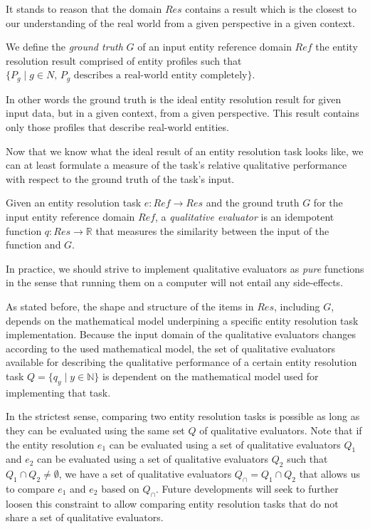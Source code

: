 \documentclass[11pt]{article}
\begin{document}
    It stands to reason that the domain $Res$ contains a result which is the
    closest to our understanding of the real world from a given perspective in
    a given context.

    \begin{defn}
        We define the \textit{ground truth} $G$ of an input entity reference
        domain $Ref$ the entity resolution result comprised of entity profiles
        such that
        $\{P_g \mid g \in N\textrm{, $P_g$ describes a real-world entity
        completely}\}$.
    \end{defn}

    In other words the ground truth is the ideal entity resolution result for 
    given input data, but in a given context, from a given perspective.
    This result contains only those profiles that describe real-world entities.

    Now that we know what the ideal result of an entity resolution task looks
    like, we can at least formulate a measure of the task's relative qualitative
    performance with respect to the ground truth of the task's input.
    
    \begin{defn}
    Given an entity resolution task $e: Ref \rightarrow Res$ and the ground
    truth $G$ for the input entity reference domain $Ref$, a \textit{qualitative
    evaluator} is an idempotent function $q: Res \rightarrow \mathbb{R}$ that
    measures the similarity between the input of the function and $G$.
    \end{defn}

    In practice, we should strive to implement qualitative evaluators as
    \textit{pure} functions in the sense that running them on a computer will
    not entail any side-effects.

    As stated before, the shape and structure of the items in $Res$, including
    $G$, depends on the mathematical model underpining a specific entity
    resolution task implementation.
    Because the input domain of the qualitative evaluators changes according to
    the used mathematical model, the set of qualitative evaluators available for
    describing the qualitative performance of a certain entity resolution task
    $Q = \{q_y \mid y \in \mathbb{N}\}$ is dependent on the mathematical model
    used for implementing that task.

    In the strictest sense, comparing two entity resolution tasks is possible as
    long as they can be evaluated using the same set $Q$ of qualitative
    evaluators.
    Note that if the entity resolution $e_1$ can be evaluated using a set of
    qualitative evaluators $Q_1$ and $e_2$ can be evaluated using a set of
    qualitative evaluators $Q_2$ such that $Q_1 \cap Q_2 \neq \emptyset$, we
    have a set of qualitative evaluators $Q_\cap = Q_1 \cap Q_2$ that allows us
    to compare $e_1$ and $e_2$ based on $Q_\cap$.
    Future developments will seek to further loosen this constraint to allow
    comparing entity resolution tasks that do not share a set of qualitative
    evaluators.
\end{document}
